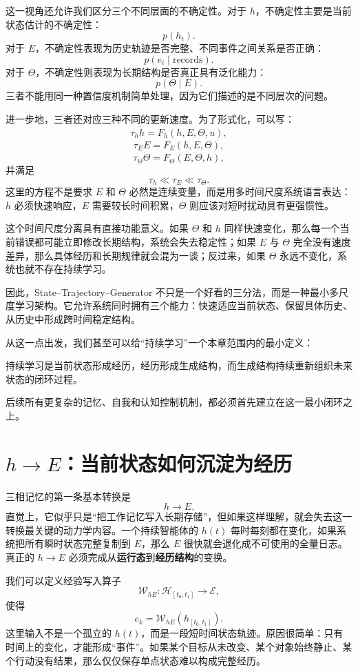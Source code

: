 这一视角还允许我们区分三个不同层面的不确定性。对于 $h$，不确定性主要是当前状态估计的不确定性：
\[
p(h_t).
\]
对于 $E$，不确定性表现为历史轨迹是否完整、不同事件之间关系是否正确：
\[
p(e_i\mid \text{records}).
\]
对于 $\Theta$，不确定性则表现为长期结构是否真正具有泛化能力：
\[
p(\Theta\mid E).
\]
三者不能用同一种置信度机制简单处理，因为它们描述的是不同层次的问题。

进一步地，三者还对应三种不同的更新速度。为了形式化，可以写：
\[
\tau_h\dot h
=
F_h(h,E,\Theta,u),
\]
\[
\tau_E\dot E
=
F_E(h,E,\Theta),
\]
\[
\tau_\Theta\dot\Theta
=
F_\Theta(E,\Theta,h),
\]
并满足
\[
\boxed{
\tau_h\ll\tau_E\ll\tau_\Theta.
}
\]
这里的方程不是要求 $E$ 和 $\Theta$ 必然是连续变量，而是用多时间尺度系统语言表达：$h$ 必须快速响应，$E$ 需要较长时间积累，$\Theta$ 则应该对短时扰动具有更强惯性。

这个时间尺度分离具有直接功能意义。如果 $\Theta$ 和 $h$ 同样快速变化，那么每一个当前错误都可能立即修改长期结构，系统会失去稳定性；如果 $E$ 与 $\Theta$ 完全没有速度差异，那么具体经历和长期规律就会混为一谈；反过来，如果 $\Theta$ 永远不变化，系统也就不存在持续学习。

因此，State--Trajectory--Generator 不只是一个好看的三分法，而是一种最小多尺度学习架构。它允许系统同时拥有三个能力：快速适应当前状态、保留具体历史、从历史中形成跨时间稳定结构。

从这一点出发，我们甚至可以给“持续学习”一个本章范围内的最小定义：
\begin{definition*}
持续学习是当前状态形成经历，经历形成生成结构，而生成结构持续重新组织未来状态的闭环过程。
\end{definition*}
后续所有更复杂的记忆、自我和认知控制机制，都必须首先建立在这一最小闭环之上。

\section{$h\rightarrow E$：当前状态如何沉淀为经历}

三相记忆的第一条基本转换是
\[
\boxed{
h\rightarrow E.
}
\]
直觉上，它似乎只是“把工作记忆写入长期存储”，但如果这样理解，就会失去这一转换最关键的动力学内容。一个持续智能体的 $h(t)$ 每时每刻都在变化，如果系统把所有瞬时状态完整复制到 $E$，那么 $E$ 很快就会退化成不可使用的全量日志。真正的 $h\rightarrow E$ 必须完成从\textbf{运行态}到\textbf{经历结构}的变换。

我们可以定义经验写入算子
\[
\mathcal{W}_{hE}:
\mathcal H_{[t_0,t_1]}
\rightarrow
\mathcal E,
\]
使得
\[
e_k
=
\mathcal W_{hE}
\left(
h_{[t_0,t_1]}
\right).
\]
这里输入不是一个孤立的 $h(t)$，而是一段短时间状态轨迹。原因很简单：只有时间上的变化，才能形成“事件”。如果某个目标从未改变、某个对象始终静止、某个行动没有结果，那么仅仅保存单点状态难以构成完整经历。

